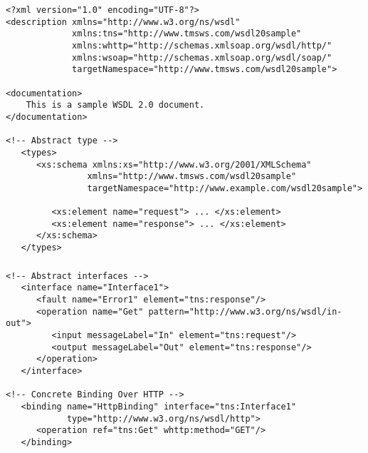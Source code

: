 \documentclass[ucs]{beamer}
\begin{document}
\begin{frame}[fragile]

  \begin{scriptsize}
  \begin{verbatim}
<?xml version="1.0" encoding="UTF-8"?>
<description xmlns="http://www.w3.org/ns/wsdl"
             xmlns:tns="http://www.tmsws.com/wsdl20sample"
             xmlns:whttp="http://schemas.xmlsoap.org/wsdl/http/"
             xmlns:wsoap="http://schemas.xmlsoap.org/wsdl/soap/"
             targetNamespace="http://www.tmsws.com/wsdl20sample">

<documentation>
    This is a sample WSDL 2.0 document.
</documentation>

<!-- Abstract type -->
   <types>
      <xs:schema xmlns:xs="http://www.w3.org/2001/XMLSchema"
                xmlns="http://www.tmsws.com/wsdl20sample"
                targetNamespace="http://www.example.com/wsdl20sample">

         <xs:element name="request"> ... </xs:element>
         <xs:element name="response"> ... </xs:element>
      </xs:schema>
   </types>
  \end{verbatim}
  \end{scriptsize}

\end{frame}




\begin{frame}[fragile]
\frametitle{}

  \begin{scriptsize}
  \begin{verbatim}
<!-- Abstract interfaces -->
   <interface name="Interface1">
      <fault name="Error1" element="tns:response"/>
      <operation name="Get" pattern="http://www.w3.org/ns/wsdl/in-out">
         <input messageLabel="In" element="tns:request"/>
         <output messageLabel="Out" element="tns:response"/>
      </operation>
   </interface>

<!-- Concrete Binding Over HTTP -->
   <binding name="HttpBinding" interface="tns:Interface1"
            type="http://www.w3.org/ns/wsdl/http">
      <operation ref="tns:Get" whttp:method="GET"/>
   </binding>
  \end{verbatim}
  \end{scriptsize}

\end{frame}
\end{document}
